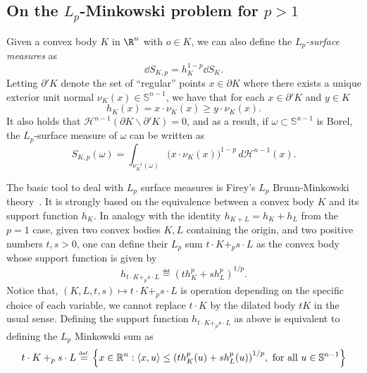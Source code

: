 \documentclass[a4paper, 10pt, twoside]{amsart}
\numberwithin{equation}{section}
\theoremstyle{plain}
\theoremstyle{definition}
\begin{document}
\subsection{On the $L_p$-Minkowski problem for $p>1$}\label{sec.technical_estimates_p>1}
Given a convex body $K$ in $\R^n$ with $o\in K$, we can also define the \textit{$L_p$-surface measures} as 
\begin{equation}
    \dd S_{K,p}=h_K^{1-p} \dd S_K. 
\end{equation}
Letting $\partial' K$ denote the set of ``regular'' points $x\in \partial K$ where there exists a unique exterior unit normal $\nu_K(x)\in \mathbb{S}^{n-1}$, we have that for each $x \in \partial' K$ and $y\in K$
\begin{equation}
\label{nuKx-def}
h_K(x) = x\cdot \nu_K(x)\geq y \cdot \nu_K(x).
\end{equation}
It also holds that $\mathcal{H}^{n-1}(\partial K\backslash \partial' K)=0$, and as a result, if $\omega\subset \mathbb{S}^{n-1}$ is Borel, the $L_p$-surface measure of $\omega$ can be written as
\begin{equation}
\label{Lp-surf-boundary}
S_{K,p}(\omega)=\int_{\nu_K^{-1}(\omega)}\big(x\cdot \nu_K(x)\big)^{1-p}\,d\mathcal{H}^{n-1}(x).
\end{equation}

The basic tool to deal with $L_p$ surface measures is Firey's $L_p$ Brunn-Minkowski theory~\cite{firey1962p}. It is strongly based on the equivalence between a convex body $K$ and its support function $h_K$. In analogy with the identity $h_{K + L} = h_K + h_L$ from the $p = 1$ case, given two convex bodies $K,L$ containing the origin, and two positive numbers $t,s > 0$, one can define their $L_p$ sum $t\cdot K +_p s\cdot L$ as the convex body whose support function is given by
\begin{equation}
    h_{t\cdot K +_p s\cdot L} \eqdef 
    {\left(
        t h_K^p + s h_L^p
    \right)}^{1/p}.
\end{equation}
Notice that, $(K,L,t,s) \mapsto t\cdot K +_p s \cdot L$ is operation depending on the specific choice of each variable, we cannot replace $t\cdot K$ by the dilated body $tK$ in the usual sense. Defining the support function $h_{t\cdot K +_p s\cdot L}$ as above is equivalent to defining the $L_p$ Minkowski sum as 
\begin{equation}
    t\cdot K +_p s\cdot L
    \stackrel{\mbox{\upshape\tiny def.}}{=} 
    \left\{
        x \in \mathbb{R}^n: 
        \left\langle x,u\right\rangle
        \le 
        {\left( t h_K^p(u) + s h_L^p(u) \right)}^{1/p}, \text{ for all }
        u \in \mathbb{S}^{n-1}
    \right\}
\end{equation}
\end{document}
